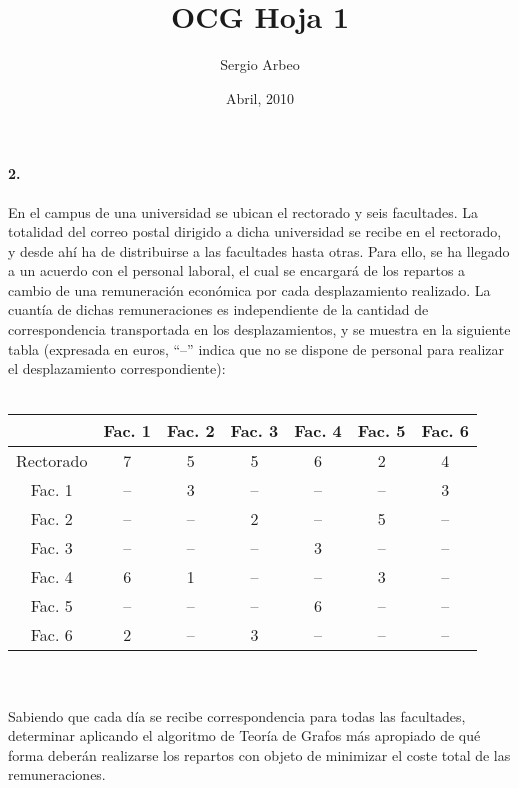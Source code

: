 \documentclass[12pt, oneside, a4paper]{article}
\begin{document}
\title{OCG Hoja 1}\author{Sergio Arbeo}\date{Abril, 2010}\maketitle
\paragraph{2.}\label{ssub:1_} %
En el campus de una universidad se ubican el rectorado y seis
facultades. La totalidad del correo postal dirigido a dicha
universidad se recibe en el rectorado, y desde ahí ha de distribuirse
a las facultades hasta otras. Para ello, se ha llegado a un acuerdo
con el personal laboral, el cual se encargará de los repartos a cambio
de una remuneración económica por cada desplazamiento realizado. La
cuantía de dichas remuneraciones es independiente de la cantidad de
correspondencia transportada en los desplazamientos, y se muestra en
la siguiente tabla (expresada en euros, ``--'' indica que no se
dispone de personal para realizar el desplazamiento correspondiente):
\\
\\

\begin{tabular}{| c | c | c | c | c | c | c | }
\hline
          & Fac. 1 & Fac. 2 & Fac. 3 & Fac. 4 & Fac. 5 & Fac. 6\\
\hline
Rectorado &   7    &   5    &   5    &   6    &   2    &   4   \\ 
\hline
Fac. 1    &  --    &   3    &  --    &  --    &  --    &   3   \\
\hline
Fac. 2    &  --    &  --    &   2    &  --    &   5    &  --   \\
\hline
Fac. 3    &  --    &  --    &  --    &   3    &  --    &  --   \\
\hline
Fac. 4    &   6    &   1    &  --    &  --    &   3    &  --   \\
\hline
Fac. 5    &  --    &  --    &  --    &   6    &  --    &  --   \\
\hline
Fac. 6    &   2    &  --    &   3    &  --    &  --    &  --   \\
\hline
\end{tabular}
\\
\\

Sabiendo que cada día se recibe correspondencia para todas las
facultades, determinar aplicando el algoritmo de Teoría de Grafos más
apropiado de qué forma deberán realizarse los repartos con objeto de
minimizar el coste total de las remuneraciones.
\end{document}
